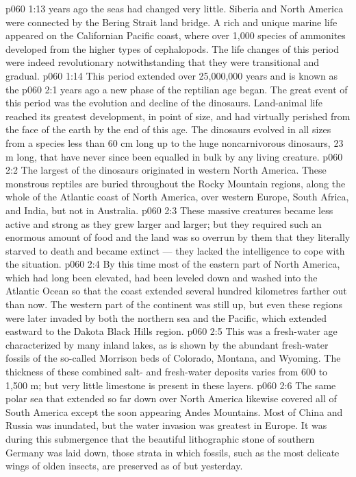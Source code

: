 \vs p060 1:13 \pc {} years ago the seas had changed very little. Siberia and North America were connected by the Bering Strait land bridge. A rich and unique marine life appeared on the Californian Pacific coast, where over 1,000 species of ammonites developed from the higher types of cephalopods. The life changes of this period were indeed revolutionary notwithstanding that they were transitional and gradual.
\vs p060 1:14 \pc This period extended over 25,000,000 years and is known as the 
\vs p060 2:1  years ago a new phase of the reptilian age began. The great event of this period was the evolution and decline of the dinosaurs. Land\hyp{}animal life reached its greatest development, in point of size, and had virtually perished from the face of the earth by the end of this age. The dinosaurs evolved in all sizes from a species less than 60 cm long up to the huge noncarnivorous dinosaurs, 23 m long, that have never since been equalled in bulk by any living creature.
\vs p060 2:2 The largest of the dinosaurs originated in western North America. These monstrous reptiles are buried throughout the Rocky Mountain regions, along the whole of the Atlantic coast of North America, over western Europe, South Africa, and India, but not in Australia.
\vs p060 2:3 These massive creatures became less active and strong as they grew larger and larger; but they required such an enormous amount of food and the land was so overrun by them that they literally starved to death and became extinct --- they lacked the intelligence to cope with the situation.
\vs p060 2:4 By this time most of the eastern part of North America, which had long been elevated, had been leveled down and washed into the Atlantic Ocean so that the coast extended several hundred kilometres farther out than now. The western part of the continent was still up, but even these regions were later invaded by both the northern sea and the Pacific, which extended eastward to the Dakota Black Hills region.
\vs p060 2:5 This was a fresh\hyp{}water age characterized by many inland lakes, as is shown by the abundant fresh\hyp{}water fossils of the so\hyp{}called Morrison beds of Colorado, Montana, and Wyoming. The thickness of these combined salt\hyp{} and fresh\hyp{}water deposits varies from 600 to 1,500 m; but very little limestone is present in these layers.
\vs p060 2:6 The same polar sea that extended so far down over North America likewise covered all of South America except the soon appearing Andes Mountains. Most of China and Russia was inundated, but the water invasion was greatest in Europe. It was during this submergence that the beautiful lithographic stone of southern Germany was laid down, those strata in which fossils, such as the most delicate wings of olden insects, are preserved as of but yesterday.
